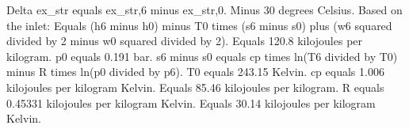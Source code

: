 Delta ex_str equals ex_str,6 minus ex_str,0.  
Minus 30 degrees Celsius.  
Based on the inlet:  
Equals (h6 minus h0) minus T0 times (s6 minus s0) plus (w6 squared divided by 2 minus w0 squared divided by 2).  
Equals 120.8 kilojoules per kilogram.  
p0 equals 0.191 bar.  
s6 minus s0 equals cp times ln(T6 divided by T0) minus R times ln(p0 divided by p6).  
T0 equals 243.15 Kelvin.  
cp equals 1.006 kilojoules per kilogram Kelvin.  
Equals 85.46 kilojoules per kilogram.  
R equals 0.45331 kilojoules per kilogram Kelvin.  
Equals 30.14 kilojoules per kilogram Kelvin.